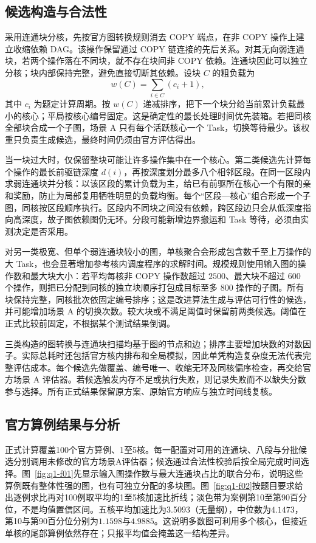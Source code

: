 \subsection{候选构造与合法性}

采用连通块分核，先按官方图转换规则消去 COPY 端点，在非 COPY 操作上建立收缩依赖 DAG。该操作保留通过 COPY 链连接的先后关系。对其无向弱连通块，若两个操作落在不同块，就不存在块间非 COPY 依赖。连通块因此可以独立分核；块内部保持完整，避免直接切断其依赖。设块 $C$ 的粗负载为
\begin{equation}\label{eq:q1-load}
w(C)=\sum_{i\in C}(c_i+1),
\end{equation}
其中 $c_i$ 为题定计算周期。按 $w(C)$ 递减排序，把下一个块分给当前累计负载最小的核心；平局按核心编号固定。这是确定性的最长处理时间优先装箱。若把同核全部块合成一个子图，场景 A 只有每个活跃核心一个 Task，切换等待最少。该权重只负责生成候选，最终时间仍须由官方评估得出。

当一块过大时，仅保留整块可能让许多操作集中在一个核心。第二类候选先计算每个操作的最长前驱链深度 $d(i)$，再按深度划分最多八个相邻区段。在同一区段内求弱连通块并分核：以该区段的累计负载为主，给已有前驱所在核心一个有限的亲和奖励，防止为局部复用牺牲明显的负载均衡。每个“区段—核心”组合形成一个子图，同核按区段顺序执行。区段内不同块之间没有依赖，跨区段边只会从低深度指向高深度，故子图依赖图仍无环。分段可能新增边界搬运和 Task 等待，必须由实测决定是否采用。

对另一类极宽、但单个弱连通块较小的图，单核聚合会形成包含数千至上万操作的大 Task，也会显著增加参考核内调度程序的求解时间。规模规则使用输入图的操作数和最大块大小：若平均每核非 COPY 操作数超过 $2500$、最大块不超过 $600$ 个操作，则把已分配到同核的独立块顺序打包成目标至多 $800$ 操作的子图。所有块保持完整，同核批次依固定编号排序；这是改进算法生成与评估可行性的候选，并可能增加场景 A 的切换次数。较大块或不满足阈值时保留前两类候选。阈值在正式比较前固定，不根据某个测试结果倒调。

三类构造的图转换与连通块扫描均基于图的节点和边；排序主要增加块数的对数因子。实际总耗时还包括官方核内排布和全局模拟，因此单凭构造复杂度无法代表完整评估成本。每个候选先做覆盖、编号唯一、收缩无环及同核偏序检查，再交给官方场景 A 评估器。若候选触发内存不足或执行失败，则记录失败而不以缺失分数参与选择。所有正式结果保留原方案、原始官方响应与独立时间线复核。

\subsection{官方算例结果与分析}

正式计算覆盖100个官方算例、1至5核。每一配置对可用的连通块、八段与分批候选分别调用未修改的官方场景A评估器；候选通过合法性校验后按全局完成时间选择。图~\ref{fig:q1-f01}先显示输入图操作数与最大连通块占比的联合分布，说明这些算例既有整体性强的图，也有可独立分配的多块图。图~\ref{fig:q1-f02}按题目要求给出逐例求比再对100例取平均的1至5核加速比折线；淡色带为案例第10至第90百分位，不是均值置信区间。五核平均加速比为3.5093（无量纲），中位数为$4.1473$，第10与第90百分位分别为$1.1598$与$4.9885$。这说明多数图可利用多个核心，但接近单核的尾部算例依然存在；只报平均值会掩盖这一结构差异。

